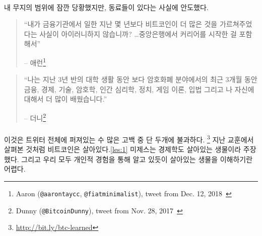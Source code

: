 
\paragraph{}
내 무지의 범위에 잠깐 당황했지만, 동료들이 있다는 사실에 안도했다.

\begin{quotation}\begin{samepage}
		\enquote{내가 금융기관에서 일한 지난 몇 년보다 비트코인이 더 많은 것을 가르쳐주었다는 사실이 
			아이러니하지 않습니까? \ldots 중앙은행에서 커리어를 시작한 걸 포함해서}
		\begin{flushright} -- 애런\footnote{Aaron (\texttt{@aarontaycc}, \texttt{@fiatminimalist}), tweet from Dec.
				12, 2018~\cite{aarontaycc-tweet}}
\end{flushright}\end{samepage}\end{quotation}

\begin{quotation}\begin{samepage}
		\enquote{나는 지난 3년 반의 대학 생활 동안 보다 암호화폐 분야에서의 최근 3개월 동안 
		금융, 경제, 기술, 암호학, 인간 심리학, 정치, 게임 이론, 입법 그리고 나 자신에 대해서 더 많이 배웠습니다.}
		\begin{flushright} -- 더니\footnote{Dunny (\texttt{@BitcoinDunny}), tweet from Nov. 28,
				2017~\cite{bitcoindunny-tweet}}
\end{flushright}\end{samepage}\end{quotation}

\paragraph{}
이것은 트위터 전체에 퍼져있는 수 많은 고백 중 단 두개에 불과하다. \footnote{\url{http://bit.ly/btc-learned}} 
지난 교훈에서 살펴본 것처럼 비트코인은 살아있다.\ref{les:1}
미제스는 경제학도 살아있는 생물이라 주장했다. 
그리고 우리 모두 개인적 경험을 통해 알고 있듯이 살아있는 생물을 이해하기란 어렵다.

